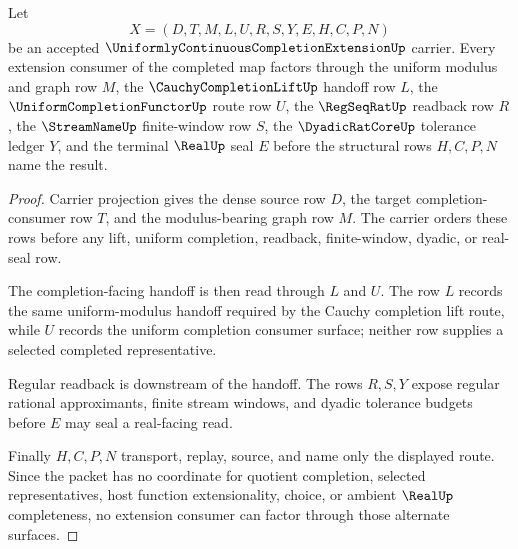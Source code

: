
\begin{theorem}
\label{thm:uniformly-continuous-completion-extension-modulus-handoff}
Let
$$
X=(D,T,M,L,U,R,S,Y,E,H,C,P,N)
$$
be an accepted $\UniformlyContinuousCompletionExtensionUp$ carrier. Every extension consumer of the completed map factors through the uniform modulus and graph row $M$, the $\CauchyCompletionLiftUp$ handoff row $L$, the $\UniformCompletionFunctorUp$ route row $U$, the $\RegSeqRatUp$ readback row $R$, the $\StreamNameUp$ finite-window row $S$, the $\DyadicRatCoreUp$ tolerance ledger $Y$, and the terminal $\RealUp$ seal $E$ before the structural rows $H,C,P,N$ name the result.
\end{theorem}
\begin{proof}
Carrier projection gives the dense source row $D$, the target completion-consumer row $T$, and the modulus-bearing graph row $M$. The carrier orders these rows before any lift, uniform completion, readback, finite-window, dyadic, or real-seal row.

The completion-facing handoff is then read through $L$ and $U$. The row $L$ records the same uniform-modulus handoff required by the Cauchy completion lift route, while $U$ records the uniform completion consumer surface; neither row supplies a selected completed representative.

Regular readback is downstream of the handoff. The rows $R,S,Y$ expose regular rational approximants, finite stream windows, and dyadic tolerance budgets before $E$ may seal a real-facing read.

Finally $H,C,P,N$ transport, replay, source, and name only the displayed route. Since the packet has no coordinate for quotient completion, selected representatives, host function extensionality, choice, or ambient $\RealUp$ completeness, no extension consumer can factor through those alternate surfaces.
\end{proof}



